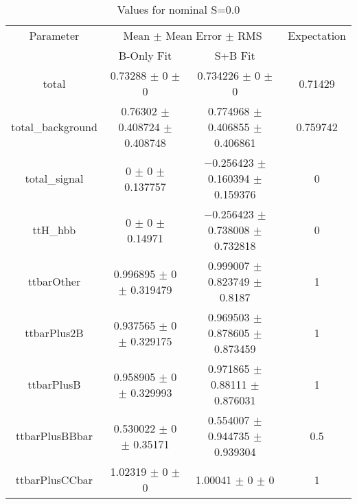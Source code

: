 \begin{table}
\centering
\caption{Values for nominal S=0.0}
\begin{tabular}{cccc}
\toprule
Parameter & \multicolumn{2}{c}{Mean $\pm$ Mean Error $\pm$ RMS} & Expectation\\
 & B-Only Fit & S+B Fit & \\
\midrule
total & \num{0.73288} $\pm$ \num{0} $\pm$ \num{0} & \num{0.734226} $\pm$ \num{0} $\pm$ \num{0} & \num{0.71429}\\
total\_background & \num{0.76302} $\pm$ \num{0.408724} $\pm$ \num{0.408748} & \num{0.774968} $\pm$ \num{0.406855} $\pm$ \num{0.406861} & \num{0.759742}\\
total\_signal & \num{0} $\pm$ \num{0} $\pm$ \num{0.137757} & \num{-0.256423} $\pm$ \num{0.160394} $\pm$ \num{0.159376} & \num{0}\\
ttH\_hbb & \num{0} $\pm$ \num{0} $\pm$ \num{0.14971} & \num{-0.256423} $\pm$ \num{0.738008} $\pm$ \num{0.732818} & \num{0}\\
ttbarOther & \num{0.996895} $\pm$ \num{0} $\pm$ \num{0.319479} & \num{0.999007} $\pm$ \num{0.823749} $\pm$ \num{0.8187} & \num{1}\\
ttbarPlus2B & \num{0.937565} $\pm$ \num{0} $\pm$ \num{0.329175} & \num{0.969503} $\pm$ \num{0.878605} $\pm$ \num{0.873459} & \num{1}\\
ttbarPlusB & \num{0.958905} $\pm$ \num{0} $\pm$ \num{0.329993} & \num{0.971865} $\pm$ \num{0.88111} $\pm$ \num{0.876031} & \num{1}\\
ttbarPlusBBbar & \num{0.530022} $\pm$ \num{0} $\pm$ \num{0.35171} & \num{0.554007} $\pm$ \num{0.944735} $\pm$ \num{0.939304} & \num{0.5}\\
ttbarPlusCCbar & \num{1.02319} $\pm$ \num{0} $\pm$ \num{0} & \num{1.00041} $\pm$ \num{0} $\pm$ \num{0} & \num{1}\\
\bottomrule
\end{tabular}
\end{table}